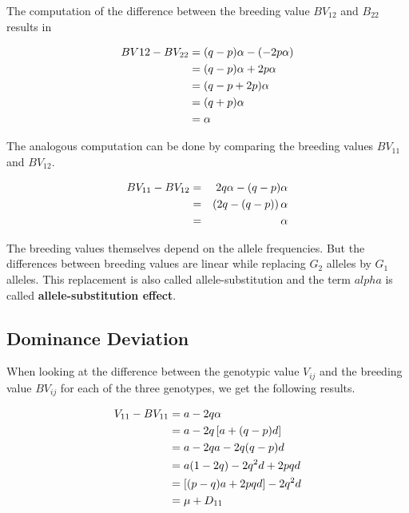 \documentclass[
]{book}
\theoremstyle{definition}
\theoremstyle{definition}
\theoremstyle{definition}
\theoremstyle{remark}
\begin{document}
The computation of the difference between the breeding value \(BV_{12}\) and \(B_{22}\) results in

\begin{align}
    BV{12} - BV_{22} &=   (q-p)\alpha - \left( -2p\alpha \right)  \notag \\
                      &=   (q-p)\alpha + 2p\alpha \notag \\
                      &=   (q-p+2p)\alpha \notag \\
                      &=   (q+p)\alpha \notag \\
                      &=   \alpha
  \label{eq:AdditiveBv1}
\end{align}

The analogous computation can be done by comparing the breeding values \(BV_{11}\) and \(BV_{12}\).

\begin{align}
    BV_{11} - BV_{12} & = & 2q\alpha - (q-p)\alpha \notag \\
                      & = & \left(2q - (q-p)\right)\alpha \notag\\
                      & = & \alpha 
  \label{eq:AdditiveBv2}
\end{align}

The breeding values themselves depend on the allele frequencies. But the differences between breeding values are linear while replacing \(G_2\) alleles by \(G_1\) alleles. This replacement is also called allele-substitution and the term \(alpha\) is called \textbf{allele-substitution effect}.

\hypertarget{dominance-deviation}{%
\subsection{Dominance Deviation}\label{dominance-deviation}}

When looking at the difference between the genotypic value \(V_{ij}\) and the breeding value \(BV_{ij}\) for each of the three genotypes, we get the following results.

\begin{align}
  V_{11} - BV_{11} &=   a - 2q \alpha \notag \\
                   &=   a - 2q \left[ a + (q-p)d \right] \notag \\
                   &=   a - 2qa -2q(q-p)d \notag \\
                   &=   a(1-2q) - 2q^2d + 2pqd \notag \\
                   &=   \left[(p - q)a + 2pqd\right] - 2q^2d \notag \\
                   &=   \mu + D_{11} 
  \end{align}
\end{document}

